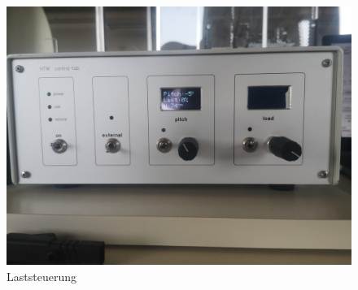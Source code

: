 \begin{figure}[h!]
\begin{minipage}[b]{0.5\textwidth}
            \includegraphics[width=\textwidth]{Abbildungen/Lastkontrolle.jpeg}
            \caption{Laststeuerung}
            \label{fig:Laststeuerung}
        \end{minipage}
    \end{figure}  
